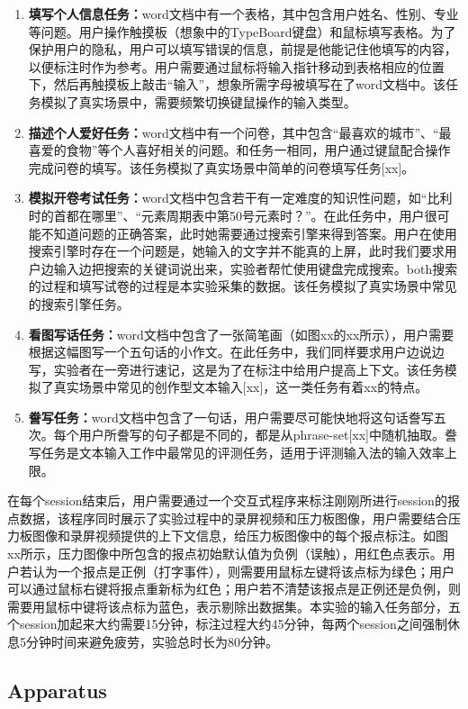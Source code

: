 \begin{enumerate}
	\item{\textbf{填写个人信息任务：}word文档中有一个表格，其中包含用户姓名、性别、专业等问题。用户操作触摸板（想象中的TypeBoard键盘）和鼠标填写表格。为了保护用户的隐私，用户可以填写错误的信息，前提是他能记住他填写的内容，以便标注时作为参考。用户需要通过鼠标将输入指针移动到表格相应的位置下，然后再触摸板上敲击“输入”，想象所需字母被填写在了word文档中。该任务模拟了真实场景中，需要频繁切换键鼠操作的输入类型。}
	\item{\textbf{描述个人爱好任务：}word文档中有一个问卷，其中包含“最喜欢的城市”、“最喜爱的食物”等个人喜好相关的问题。和任务一相同，用户通过键鼠配合操作完成问卷的填写。该任务模拟了真实场景中简单的问卷填写任务[xx]。}
	\item{\textbf{模拟开卷考试任务：}word文档中包含若干有一定难度的知识性问题，如“比利时的首都在哪里”、“元素周期表中第50号元素时？”。在此任务中，用户很可能不知道问题的正确答案，此时她需要通过搜索引擎来得到答案。用户在使用搜索引擎时存在一个问题是，她输入的文字并不能真的上屏，此时我们要求用户边输入边把搜索的关键词说出来，实验者帮忙使用键盘完成搜索。both搜索的过程和填写试卷的过程是本实验采集的数据。该任务模拟了真实场景中常见的搜索引擎任务。}
	\item{\textbf{看图写话任务：}word文档中包含了一张简笔画（如图xx的xx所示），用户需要根据这幅图写一个五句话的小作文。在此任务中，我们同样要求用户边说边写，实验者在一旁进行速记，这是为了在标注中给用户提高上下文。该任务模拟了真实场景中常见的创作型文本输入[xx]，这一类任务有着xx的特点。}
	\item{\textbf{誊写任务：}word文档中包含了一句话，用户需要尽可能快地将这句话誊写五次。每个用户所誊写的句子都是不同的，都是从phrase-set[xx]中随机抽取。誊写任务是文本输入工作中最常见的评测任务，适用于评测输入法的输入效率上限。}
\end{enumerate}

在每个session结束后，用户需要通过一个交互式程序来标注刚刚所进行session的报点数据，该程序同时展示了实验过程中的录屏视频和压力板图像，用户需要结合压力板图像和录屏视频提供的上下文信息，给压力板图像中的每个报点标注。如图xx所示，压力图像中所包含的报点初始默认值为负例（误触），用红色点表示。用户若认为一个报点是正例（打字事件），则需要用鼠标左键将该点标为绿色；用户可以通过鼠标右键将报点重新标为红色；用户若不清楚该报点是正例还是负例，则需要用鼠标中键将该点标为蓝色，表示剔除出数据集。本实验的输入任务部分，五个session加起来大约需要15分钟，标注过程大约45分钟，每两个session之间强制休息5分钟时间来避免疲劳，实验总时长为80分钟。

\subsection{Apparatus}

